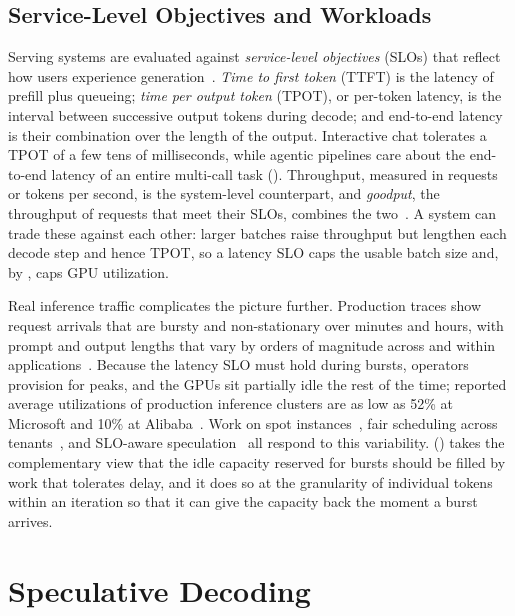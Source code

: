 \subsection{Service-Level Objectives and Workloads}
\label{background:subsec:slo}

Serving systems are evaluated against \emph{service-level objectives} (SLOs) that reflect how users experience generation~\cite{zhong2024distserve,wang2024towards,adaserve}.
\emph{Time to first token} (TTFT) is the latency of prefill plus queueing; \emph{time per output token} (TPOT), or per-token latency, is the interval between successive output tokens during decode; and end-to-end latency is their combination over the length of the output.
Interactive chat tolerates a TPOT of a few tens of milliseconds, while agentic pipelines care about the end-to-end latency of an entire multi-call task ().
Throughput, measured in requests or tokens per second, is the system-level counterpart, and \emph{goodput}, the throughput of requests that meet their SLOs, combines the two~\cite{zhong2024distserve,turbospec}.
A system can trade these against each other: larger batches raise throughput but lengthen each decode step and hence TPOT, so a latency SLO caps the usable batch size and, by , caps GPU utilization.

Real inference traffic complicates the picture further.
Production traces show request arrivals that are bursty and non-stationary over minutes and hours, with prompt and output lengths that vary by orders of magnitude across and within applications~\cite{wang2024towards,burstgpt}.
Because the latency SLO must hold during bursts, operators provision for peaks, and the GPUs sit partially idle the rest of the time; reported average utilizations of production inference clusters are as low as 52\% at Microsoft and 10\% at Alibaba~\cite{lithos2025}.
Work on spot instances~\cite{miao2023spotserve}, fair scheduling across tenants~\cite{sheng2024fairness,aqua2024}, and SLO-aware speculation~\cite{adaserve,turbospec} all respond to this variability.
\FlexLLM () takes the complementary view that the idle capacity reserved for bursts should be filled by work that tolerates delay, and it does so at the granularity of individual tokens within an iteration so that it can give the capacity back the moment a burst arrives.

\section{Speculative Decoding}
\label{background:sec:specdec}

